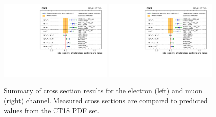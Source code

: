 \begin{figure}[htpb]
\includegraphics[width=0.49\textwidth]{plots/Results/xsecSummary13TeV_ele_ct18.pdf}
\includegraphics[width=0.49\textwidth]{plots/Results/xsecSummary13TeV_muon_ct18.pdf}
\caption{Summary of cross section results for the \serah electron (left) and muon (right) channel. Measured cross sections are compared to predicted values from the CT18 PDF set.}
\label{fig:xs:ct18:13}
\end{figure}